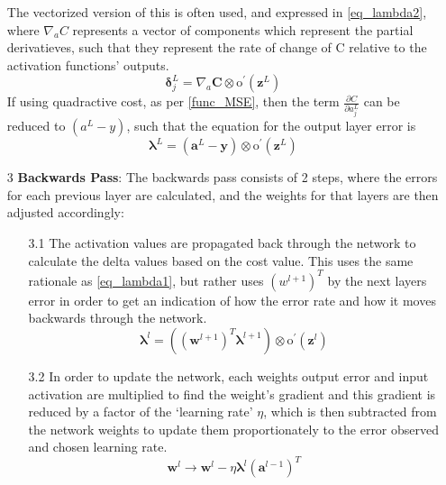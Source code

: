 \documentclass[a4paper,11pt,oneside]{article}
\theoremstyle{plain}
\theoremstyle{definition}
\begin{document}
\begin{itemize}
	The vectorized version of this is often used, and expressed in \eqref{eq_lambda2}, where $\nabla_a C$ represents a vector of components which represent the partial derivatieves, such that they represent the rate of change of C relative to the activation functions' outputs.
		\begin{equation}\label{eq_lambda2}
		\mathbf{\delta}_{j}^{L}=\nabla_a \mathbf{C} \otimes \mathrm{o}^{\prime}(\mathbf{z}^L)
		\end{equation}
	If using quadractive cost, as per \ref{func_MSE}, then the term $\frac{\partial C}{\partial a_{j}^{L}}$ can be reduced to $(a^L - y)$, such that the equation for the output layer error is
	\begin{equation}\label{eq_lambda3}
				\mathbf{\lambda}^L = (\mathbf{a}^L - \mathbf{y}) \otimes \mathrm{o}^{\prime}(\mathbf{z}^L)
	\end{equation}
	\newline		
	\item [3] \textbf{Backwards Pass}: The backwards pass consists of 2 steps, where the errors for each previous layer are calculated, and the weights for that layers are then adjusted accordingly:
		\begin{itemize}
		\item [3.1] The activation values are propagated back through the network to calculate the delta values based on the cost value. This uses the same rationale as \eqref{eq_lambda1}, but rather uses $(w^{l+1})^T$ by the next layers error in order to get an indication of how the error rate and how it moves backwards through the network.
						\begin{equation}\label{eq_lambda4}
						\mathbf{\lambda}^l = ((\mathbf{w}^{l+1})^T\mathbf{\lambda}^{l+1})  \otimes \mathrm{o}^{\prime}(\mathbf{z}^l)
						\end{equation}
		\item [3.2] In order to update the network, each weights output error and input activation are multiplied to find the weight’s gradient and this gradient is reduced by a factor of the ‘learning rate’ $\eta$, which is then subtracted from the network weights to update them proportionately to the error observed and chosen learning rate.
						\begin{equation}\label{eq_bp_weightupdate}
						\mathbf{w}^l \rightarrow \mathbf{w}^l - {\eta}\mathbf{\lambda}^{l} (\mathbf{a}^{l - 1})^T
						\end{equation}
	\end{itemize}
		
\end{itemize}
\end{document}
